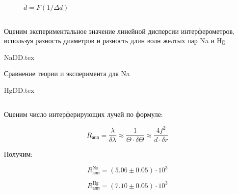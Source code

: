 \begin{figure}[h!]
  \caption{$\overline{d} = F(1/\Delta d)$}
  \label{img::avg_diam_na}
\end{figure}

\newpage

\subsection{}

Оценим экспериментальное значение линейной дисперсии интерферометров,
используя разность диаметров и разность длин волн желтых пар Na и Hg

\begin{table}[h!]
  \begin{center}
    {NaDD.tex}
  \end{center}
  \caption{Сравнение теории и эксперимента для Na}
\end{table}

{HgDD.tex}

\subsection{}

Оценим число интерферирующих лучей по формуле:

$$
R_{\text{апп}} =  \frac{\lambda}{\delta \lambda} \approx \frac{1}{\Theta \cdot \delta \Theta} \approx \frac{4 f^2}{d \cdot \delta r}
$$

Получим:

$$R_{\text{апп}}^{\text{Na}} = (5.06 \pm 0.05 ) \cdot 10^3$$

$$R_{\text{апп}}^{\text{Hg}} = (7.10 \pm 0.05 ) \cdot 10^3$$



